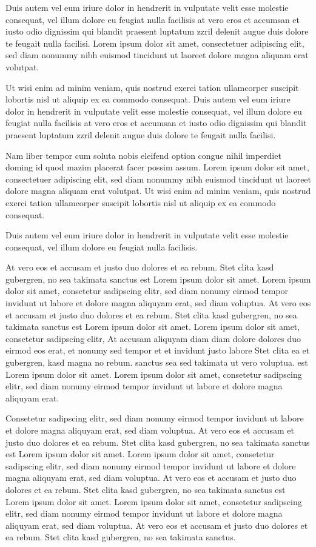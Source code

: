 Duis autem vel eum iriure dolor in hendrerit in vulputate velit esse molestie consequat, vel illum dolore eu feugiat nulla facilisis at vero eros et accumsan et iusto odio dignissim qui blandit praesent luptatum zzril delenit augue duis dolore te feugait nulla facilisi. Lorem ipsum dolor sit amet, consectetuer adipiscing elit, sed diam nonummy nibh euismod tincidunt ut laoreet dolore magna aliquam erat volutpat.  

Ut wisi enim ad minim veniam, quis nostrud exerci tation ullamcorper suscipit lobortis nisl ut aliquip ex ea commodo consequat. Duis autem vel eum iriure dolor in hendrerit in vulputate velit esse molestie consequat, vel illum dolore eu feugiat nulla facilisis at vero eros et accumsan et iusto odio dignissim qui blandit praesent luptatum zzril delenit augue duis dolore te feugait nulla facilisi.  

Nam liber tempor cum soluta nobis eleifend option congue nihil imperdiet doming id quod mazim placerat facer possim assum. Lorem ipsum dolor sit amet, consectetuer adipiscing elit, sed diam nonummy nibh euismod tincidunt ut laoreet dolore magna aliquam erat volutpat. Ut wisi enim ad minim veniam, quis nostrud exerci tation ullamcorper suscipit lobortis nisl ut aliquip ex ea commodo consequat.  

Duis autem vel eum iriure dolor in hendrerit in vulputate velit esse molestie consequat, vel illum dolore eu feugiat nulla facilisis.   

At vero eos et accusam et justo duo dolores et ea rebum. Stet clita kasd gubergren, no sea takimata sanctus est Lorem ipsum dolor sit amet. Lorem ipsum dolor sit amet, consetetur sadipscing elitr, sed diam nonumy eirmod tempor invidunt ut labore et dolore magna aliquyam erat, sed diam voluptua. At vero eos et accusam et justo duo dolores et ea rebum. Stet clita kasd gubergren, no sea takimata sanctus est Lorem ipsum dolor sit amet. Lorem ipsum dolor sit amet, consetetur sadipscing elitr, At accusam aliquyam diam diam dolore dolores duo eirmod eos erat, et nonumy sed tempor et et invidunt justo labore Stet clita ea et gubergren, kasd magna no rebum. sanctus sea sed takimata ut vero voluptua. est Lorem ipsum dolor sit amet. Lorem ipsum dolor sit amet, consetetur sadipscing elitr, sed diam nonumy eirmod tempor invidunt ut labore et dolore magna aliquyam erat.  

Consetetur sadipscing elitr, sed diam nonumy eirmod tempor invidunt ut labore et dolore magna aliquyam erat, sed diam voluptua. At vero eos et accusam et justo duo dolores et ea rebum. Stet clita kasd gubergren, no sea takimata sanctus est Lorem ipsum dolor sit amet. Lorem ipsum dolor sit amet, consetetur sadipscing elitr, sed diam nonumy eirmod tempor invidunt ut labore et dolore magna aliquyam erat, sed diam voluptua. At vero eos et accusam et justo duo dolores et ea rebum. Stet clita kasd gubergren, no sea takimata sanctus est Lorem ipsum dolor sit amet. Lorem ipsum dolor sit amet, consetetur sadipscing elitr, sed diam nonumy eirmod tempor invidunt ut labore et dolore magna aliquyam erat, sed diam voluptua. At vero eos et accusam et justo duo dolores et ea rebum. Stet clita kasd gubergren, no sea takimata sanctus.  

